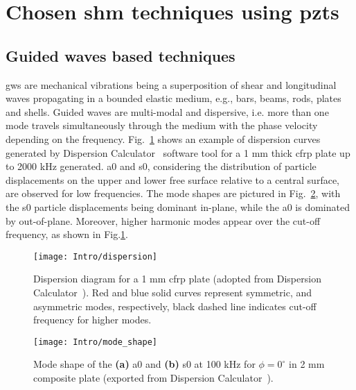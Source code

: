 \section{Chosen \ac{shm} techniques using \acp{pzt}}
\label{sec:techniques}


\subsection{Guided waves based techniques}


\Acp{gw} are mechanical vibrations being a superposition of shear and longitudinal waves propagating in a bounded elastic medium, e.g., bars, beams, rods, plates and shells. 
Guided waves are multi-modal and dispersive, i.e. more than one mode travels simultaneously through the medium with the phase velocity depending on the frequency.
Fig.~\ref{fig:dispersion} shows an example of dispersion curves generated by Dispersion Calculator~\cite{huber2021dispersion} software tool for a 1 mm thick \ac{cfrp} plate up to 2000 kHz generated.
\Ac{a0} and \ac{s0}, considering the distribution of particle displacements on the upper and lower free surface relative to a central surface, are observed for low frequencies.
The mode shapes are pictured in Fig.~\ref{fig:mode_shape}, with the \ac{s0} particle displacements being dominant in-plane, while the \ac{a0} is dominated by out-of-plane.
Moreover, higher harmonic modes appear over the cut-off frequency, as shown in Fig.\ref{fig:dispersion}.
\begin{figure}
	\texttt{[image: Intro/dispersion]}
	\caption{Dispersion diagram for a 1 mm \ac{cfrp} plate (adopted from Dispersion Calculator~\cite{huber2021dispersion}). Red and blue solid curves represent symmetric, and asymmetric modes, respectively, black dashed line indicates cut-off frequency for higher modes.}
	\label{fig:dispersion}
\end{figure}
\begin{figure}
	\texttt{[image: Intro/mode\_shape]}
	\caption{Mode shape of the \textbf{(a)} \ac{a0} and \textbf{(b)} \ac{s0} at 100 kHz for \(\phi=0^{\circ}\) in 2 mm composite plate (exported from Dispersion Calculator~\cite{huber2021dispersion}).}
	\label{fig:mode_shape}
\end{figure}

